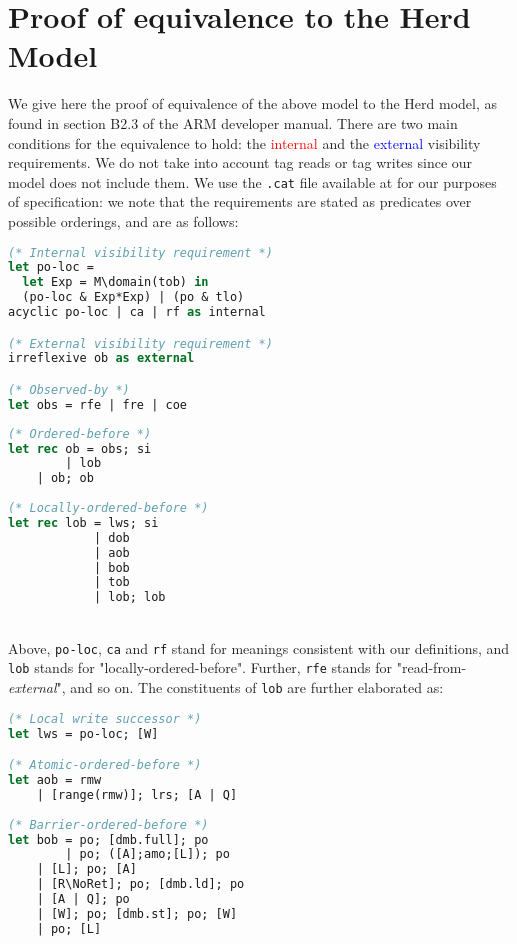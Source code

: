 \documentclass{article}
\newcommand{\var}{\texttt}
\begin{document}
\section{Proof of equivalence to the Herd Model}
We give here the proof of equivalence of the above model to the Herd model, as found in section B2.3 of the ARM developer manual. There are two main conditions for the equivalence to hold: the \textcolor{red}{internal} and the \textcolor{blue}{external} visibility requirements. We do not take into account tag reads or tag writes since our model does not include them. We use the \var{.cat} file available at \cite{catfile} for our purposes of specification: we note that the requirements are stated as predicates over possible orderings, and are as follows:\\
\noindent\begin{minipage}{.45\textwidth}
\begin{lstlisting}[language=ML]
(* Internal visibility requirement *)
let po-loc =
  let Exp = M\domain(tob) in
  (po-loc & Exp*Exp) | (po & tlo)
acyclic po-loc | ca | rf as internal

(* External visibility requirement *)
irreflexive ob as external

(* Observed-by *)
let obs = rfe | fre | coe
\end{lstlisting}
\end{minipage}\hfill
\begin{minipage}{.45\textwidth}
\begin{lstlisting}[language=ML]
(* Ordered-before *)
let rec ob = obs; si
        | lob
	| ob; ob
	
(* Locally-ordered-before *)
let rec lob = lws; si
            | dob
            | aob
            | bob
            | tob
            | lob; lob
\end{lstlisting}
\end{minipage}\\
Above, \var{po-loc}, \var{ca} and \var{rf} stand for meanings consistent with our definitions, and \var{lob} stands for "locally-ordered-before". Further, \var{rfe} stands for "read-from-\textit{external}", and so on. The constituents of \var{lob} are further elaborated as:\\
\noindent\begin{minipage}{.40\textwidth}
\begin{lstlisting}[language=ML]
(* Local write successor *)
let lws = po-loc; [W]

(* Atomic-ordered-before *)
let aob = rmw
	| [range(rmw)]; lrs; [A | Q]
	
(* Barrier-ordered-before *)
let bob = po; [dmb.full]; po
        | po; ([A];amo;[L]); po
	| [L]; po; [A]
	| [R\NoRet]; po; [dmb.ld]; po
	| [A | Q]; po
	| [W]; po; [dmb.st]; po; [W]
	| po; [L]
\end{lstlisting}
\end{minipage}\hfill
\end{document}
